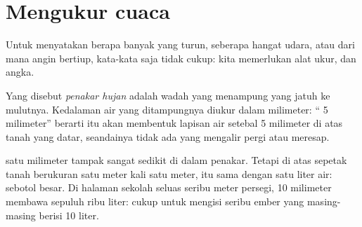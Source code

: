 \section{Mengukur cuaca}

Untuk menyatakan berapa banyak  yang turun, seberapa hangat udara,
atau dari mana angin bertiup, kata-kata saja tidak cukup: kita memerlukan
alat ukur, dan angka.

\begin{definition}\label{def:g4:clouds-rain-snow:rain-gauge}
Yang disebut \emph{penakar hujan} adalah wadah yang
menampung  yang jatuh ke mulutnya. Kedalaman air yang ditampungnya
diukur dalam milimeter: `` 5 milimeter'' berarti  itu akan
membentuk lapisan air setebal 5 milimeter di atas tanah yang datar,
seandainya tidak ada yang mengalir pergi atau meresap.
\end{definition}

\begin{remark}\label{rem:g4:clouds-rain-snow:litre}
 satu milimeter tampak sangat sedikit di dalam penakar. Tetapi di atas
sepetak tanah berukuran satu meter kali satu meter,  itu sama dengan
satu liter air: sebotol besar. Di halaman sekolah seluas seribu meter
persegi,  10 milimeter membawa sepuluh ribu liter: cukup untuk
mengisi seribu ember yang masing-masing berisi 10 liter.
\end{remark}

